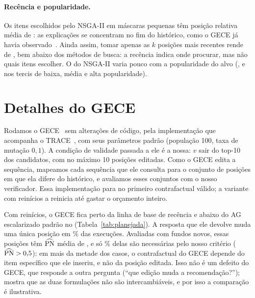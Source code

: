 \paragraph{Recência e popularidade.}
Os itens escolhidos pelo NSGA-II em máscaras pequenas têm posição relativa
média de : as explicações se concentram no fim do
histórico, como o GECE já havia observado~\cite{scarcelli2025gece}. Ainda
assim, tomar apenas as $k$ posições mais recentes rende \HVp{} de
, bem abaixo dos métodos de busca: a recência indica onde
procurar, mas não quais itens escolher. O \HVp{} do NSGA-II varia pouco com a
popularidade do alvo (,  e
 nos tercis de baixa, média e alta popularidade).

\section{Detalhes do GECE}
\label{ap:gece}

Rodamos o GECE~\cite{scarcelli2025gece} sem alterações de código, pela
implementação que acompanha o TRACE~\cite{kim2026trace}, com seus parâmetros
padrão (população 100, taxa de mutação $0{,}1$). A condição de validade passada
a ele é a nossa: $v$ sair do top-10 dos candidatos, com no máximo 10 posições
editadas. Como o GECE edita a sequência, mapeamos cada sequência que ele
consulta para o conjunto de posições em que ela difere do histórico, e
avaliamos esses conjuntos com o nosso verificador. Essa implementação para no
primeiro contrafactual válido; a variante com reinícios a reinicia até gastar o
orçamento inteiro.

Com reinícios, o GECE fica perto da linha de base de recência e abaixo do AG
escalarizado padrão no \HVp{} (Tabela~\ref{tab:planejada}). A resposta que ele
devolve muda uma única posição em \% das execuções. Avaliadas
com fundos novos, essas posições têm $\widehat{\mathrm{PN}}$ média de , e
só \% delas são necessárias pelo nosso critério
($\widehat{\mathrm{PN}}>0{,}5$): em mais da metade dos casos, o contrafactual do GECE
depende do item específico que ele inseriu, e não da posição editada. Isso não
é um defeito do GECE, que responde a outra pergunta (``que edição muda a
recomendação?''); mostra que as duas formulações não são intercambiáveis, e
por isso a comparação é ilustrativa.


